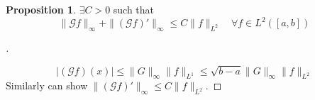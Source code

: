 \documentclass{article}
\theoremstyle{definition}
\newtheorem{prop}{Proposition}
\newenvironment{proofs}[1][\proofname]{%
  \begin{proof}[#1]$ $\par\nobreak\ignorespaces
}{%
  \end{proof}
}
\newcommand{\G}{\mathcal G}
\begin{document}
\begin{prop}
	$\exists C > 0$ such that
	\[
		\| \G f\|_{\infty} + \|(\G f)'\|_{\infty} \leq C \| f\|_{L^2} \quad \forall f \in L^2([a, b])
	\]
\end{prop}

\begin{proofs}
	\[
		|(\G f)(x)| \leq \|G\|_\infty \|f\|_{L^1} \leq \sqrt{b - a} \|G\|_{\infty} \|f\|_{L^2}
	\]
	Similarly can show $\|(\G f)'\|_{\infty} \leq C \|f\|_{L^2}$.
\end{proofs}
\end{document}
